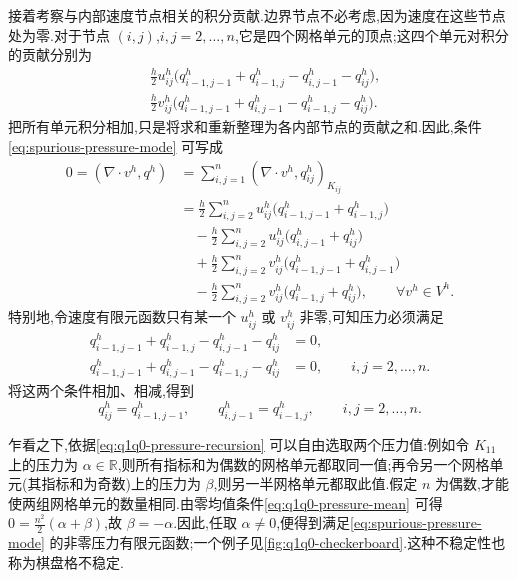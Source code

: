 \begin{example}[($Q_1/Q_0$ 有限元空间对)]
接着考察与内部速度节点相关的积分贡献.边界节点不必考虑,因为速度在这些节点处为零.对于节点 $(i,j)$,$i,j=2,\ldots,n$,它是四个网格单元的顶点;这四个单元对积分的贡献分别为
\[
\begin{aligned}
  &\frac{h}{2}u_{ij}^h
     \bigl(q_{i-1,j-1}^h+q_{i-1,j}^h-q_{i,j-1}^h-q_{ij}^h\bigr),\\
  &\frac{h}{2}v_{ij}^h
     \bigl(q_{i-1,j-1}^h+q_{i,j-1}^h-q_{i-1,j}^h-q_{ij}^h\bigr).
\end{aligned}
\]
把所有单元积分相加,只是将求和重新整理为各内部节点的贡献之和.因此,条件\cref{eq:spurious-pressure-mode} 可写成
\[
\begin{aligned}
  0=(\nabla\cdot v^h,q^h)
   &=\sum_{i,j=1}^{n}(\nabla\cdot v^h,q_{ij}^h)_{K_{ij}}\\
   &=\frac{h}{2}\sum_{i,j=2}^{n}u_{ij}^h
       \bigl(q_{i-1,j-1}^h+q_{i-1,j}^h\bigr)\\
   &\quad-\frac{h}{2}\sum_{i,j=2}^{n}u_{ij}^h
       \bigl(q_{i,j-1}^h+q_{ij}^h\bigr)\\
   &\quad+\frac{h}{2}\sum_{i,j=2}^{n}v_{ij}^h
       \bigl(q_{i-1,j-1}^h+q_{i,j-1}^h\bigr)\\
   &\quad-\frac{h}{2}\sum_{i,j=2}^{n}v_{ij}^h
       \bigl(q_{i-1,j}^h+q_{ij}^h\bigr),
       \qquad\forall v^h\in V^h.
\end{aligned}
\]
特别地,令速度有限元函数只有某一个 $u_{ij}^h$ 或 $v_{ij}^h$ 非零,可知压力必须满足
\[
\begin{aligned}
  q_{i-1,j-1}^h+q_{i-1,j}^h-q_{i,j-1}^h-q_{ij}^h&=0,\\
  q_{i-1,j-1}^h+q_{i,j-1}^h-q_{i-1,j}^h-q_{ij}^h&=0,
  \qquad i,j=2,\ldots,n.
\end{aligned}
\]
将这两个条件相加、相减,得到
\begin{equation}\label{eq:q1q0-pressure-recursion}
  q_{ij}^h=q_{i-1,j-1}^h,
  \qquad q_{i,j-1}^h=q_{i-1,j}^h,
  \qquad i,j=2,\ldots,n.
\end{equation}

乍看之下,依据\cref{eq:q1q0-pressure-recursion} 可以自由选取两个压力值:例如令 $K_{11}$ 上的压力为 $\alpha\in\mathbb{R}$,则所有指标和为偶数的网格单元都取同一值;再令另一个网格单元(其指标和为奇数)上的压力为 $\beta$,则另一半网格单元都取此值.假定 $n$ 为偶数,才能使两组网格单元的数量相同.由零均值条件\cref{eq:q1q0-pressure-mean} 可得 $0=\frac{n^2}{2}(\alpha+\beta)$,故 $\beta=-\alpha$.因此,任取 $\alpha\ne0$,便得到满足\cref{eq:spurious-pressure-mode} 的非零压力有限元函数;一个例子见\cref{fig:q1q0-checkerboard}.这种不稳定性也称为棋盘格不稳定.
\end{example}

